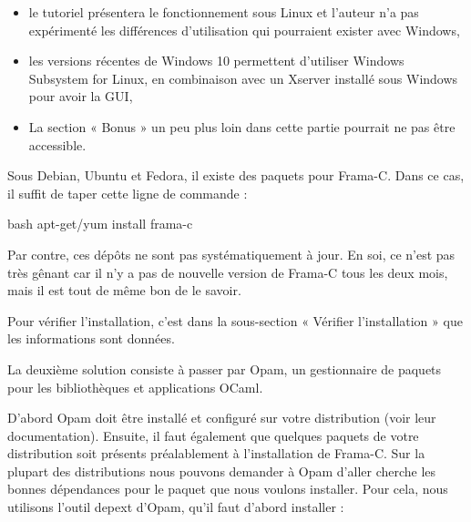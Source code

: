 \begin{Warning}
\begin{itemize}
\item le tutoriel présentera le fonctionnement sous Linux et l'auteur n'a pas
expérimenté les différences d'utilisation qui pourraient exister avec
Windows,
\item les versions récentes de Windows 10 permettent d'utiliser Windows Subsystem
  for Linux, en combinaison avec un Xserver installé sous Windows pour avoir la
  GUI,
\item La section « Bonus » un peu plus loin dans cette partie pourrait ne pas être
accessible.
\end{itemize}
\end{Warning}






Sous Debian, Ubuntu et Fedora, il existe des paquets pour Frama-C. Dans ce cas,
il suffit de taper cette ligne de commande :



\begin{CodeBlock}{bash}
apt-get/yum install frama-c
\end{CodeBlock}



Par contre, ces dépôts ne sont pas systématiquement à jour. En soi, ce n'est pas très gênant car il n'y a pas de nouvelle version de Frama-C tous les deux mois, mais il est tout de même bon de le savoir.



Pour vérifier l'installation, c'est dans la sous-section « Vérifier l'installation »
que les informations sont données.





La deuxième solution consiste à passer par Opam, un gestionnaire de paquets
pour les bibliothèques et applications OCaml.


D'abord Opam doit être installé et configuré sur votre distribution (voir
leur documentation). Ensuite, il faut également que quelques paquets de votre
distribution soit présents préalablement à l'installation de Frama-C. Sur la
plupart des distributions nous pouvons demander à Opam d'aller cherche les
bonnes dépendances pour le paquet que nous voulons installer. Pour cela, nous
utilisons l'outil depext d'Opam, qu'il faut d'abord installer :


